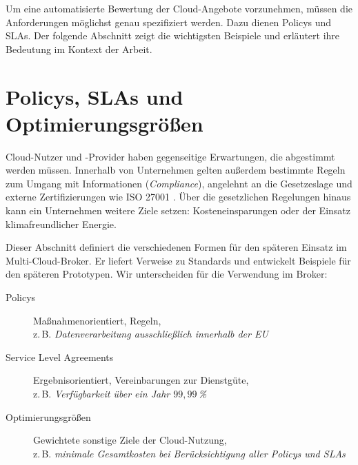 Um eine automatisierte Bewertung der Cloud-Angebote vorzunehmen, müssen die Anforderungen möglichst genau spezifiziert werden. Dazu dienen Policys und SLAs. Der folgende Abschnitt zeigt die wichtigsten Beispiele und erläutert ihre Bedeutung im Kontext der Arbeit.

%

%
%


\section{Policys, SLAs und Optimierungsgrößen}

Cloud-Nutzer und -Provider haben gegenseitige Erwartungen, die abgestimmt werden müssen. Innerhalb von Unternehmen gelten außerdem bestimmte Regeln zum Umgang mit Informationen (\emph{Compliance}), angelehnt an die Gesetzeslage und externe Zertifizierungen wie ISO 27001 \cite{iso:2013:27001}. Über die gesetzlichen Regelungen hinaus kann ein Unternehmen weitere Ziele setzen: Kosteneinsparungen oder der Einsatz klimafreundlicher Energie. 

Dieser Abschnitt definiert die verschiedenen Formen für den späteren Einsatz im Multi-Cloud-Broker. Er liefert Verweise zu Standards und entwickelt Beispiele für den späteren Prototypen. Wir unterscheiden für die Verwendung im Broker:

\begin{description}
	\item[Policys] Maßnahmenorientiert, Regeln, \\
	z.\,B. \emph{Datenverarbeitung ausschließlich innerhalb der EU}
	\item[Service Level Agreements] Ergebnisorientiert, Vereinbarungen zur Dienstgüte, \\
	z.\,B. \emph{Verfügbarkeit über ein Jahr $99,99\,$\%}
	\item[Optimierungsgrößen] Gewichtete sonstige Ziele der Cloud-Nutzung, \\
	z.\,B. \emph{minimale Gesamtkosten bei Berücksichtigung aller Policys und SLAs}
\end{description}

